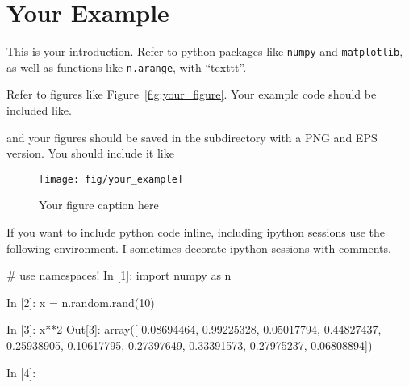 \section{Your Example}
\label{sec:your_example}

This is your introduction.  Refer to python packages like
\texttt{numpy} and \texttt{matplotlib}, as well as functions like
\texttt{n.arange}, with ``texttt''.

Refer to figures like Figure~\ref{fig:your_figure}.  Your example code
should be included like.  



and your figures should be saved in the  subdirectory with
a PNG and EPS version. You should include it like

\begin{figure}
\begin{centering}\texttt{[image: fig/your\_example]}\par\end{centering}

\caption{\label{fig:your_example}Your figure caption here}
\end{figure}

If you want to include python code inline, including ipython sessions use the following environment.  I sometimes decorate ipython sessions with comments.

\begin{listing}
# use namespaces!
In [1]: import numpy as n

In [2]: x = n.random.rand(10)

In [3]: x**2
Out[3]: 
array([ 0.08694464,  0.99225328,  0.05017794,  0.44827437,  0.25938905,
        0.10617795,  0.27397649,  0.33391573,  0.27975237,  0.06808894])

In [4]: 

\end{listing}